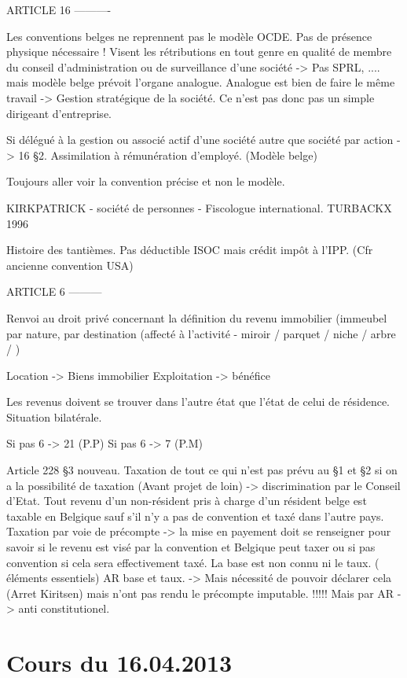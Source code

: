 \documentclass{book}
\begin{document}
ARTICLE 16
----------

Les conventions belges ne reprennent pas le modèle OCDE. Pas de présence physique nécessaire ! Visent les rétributions en tout genre en qualité de membre du conseil d'administration ou de surveillance d'une société -> Pas SPRL, .... mais modèle belge prévoit l'organe analogue. Analogue est bien de faire le même travail -> Gestion stratégique de la société. Ce n'est pas donc pas un simple dirigeant d'entreprise.

Si délégué à la gestion ou associé actif d'une société autre que société par action -> 16 §2. Assimilation à rémunération d'employé. (Modèle belge)

Toujours aller voir la convention précise et non le modèle. 

KIRKPATRICK - société de personnes - Fiscologue international. TURBACKX 1996

Histoire des tantièmes. Pas déductible ISOC mais crédit impôt à l'IPP. (Cfr ancienne convention USA)


ARTICLE 6
---------

Renvoi au droit privé concernant la définition du revenu immobilier (immeubel par nature, par destination (affecté à l'activité - miroir / parquet / niche / arbre / )

Location -> Biens immobilier
Exploitation -> bénéfice

Les revenus doivent se trouver dans l'autre état que l'état de celui de résidence. Situation bilatérale.

Si pas 6 -> 21 (P.P)
Si pas 6 -> 7 (P.M)

Article 228 §3 nouveau. Taxation de tout ce qui n'est pas prévu au §1 et §2 si on a la possibilité de taxation (Avant projet de loin) -> discrimination par le Conseil d'Etat. Tout revenu d'un non-résident pris à charge d'un résident belge est taxable en Belgique sauf s'il n'y a pas de convention et taxé dans l'autre pays. Taxation par voie de précompte -> la mise en payement doit se renseigner pour savoir si le revenu est visé par la convention et Belgique peut taxer ou si pas convention si cela sera effectivement taxé. La base est non connu ni le taux. ( éléments essentiels) AR base et taux. -> Mais nécessité de pouvoir déclarer cela (Arret Kiritsen) mais n'ont pas rendu le précompte imputable. !!!!! Mais par AR -> anti constitutionel.

\chapter{Cours du 16.04.2013}
\end{document}
